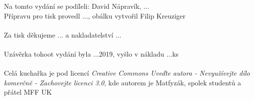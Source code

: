 \tableofcontents
{}
\vspace*{\fill}
Na tomto vydání se podíleli: David Nápravík, ... \\
Přípravu pro tisk provedl ..., obálku vytvořil Filip Kreuziger\\
\\
Za tisk děkujeme ... a nakladatelství ... \\
\\
Uzávěrka tohoot vydání byla ...2019, vyšlo v nákladu ...ks \\
\\
Celá kuchařka je pod licencí \textit{Creative Commons Uveďte autora - Nevyužívejte dílo komerčně - Zachovejte licenci 3.0}, kde autorem je Matfyzák, spolek studentů a přátel MFF UK
\newpage
{}